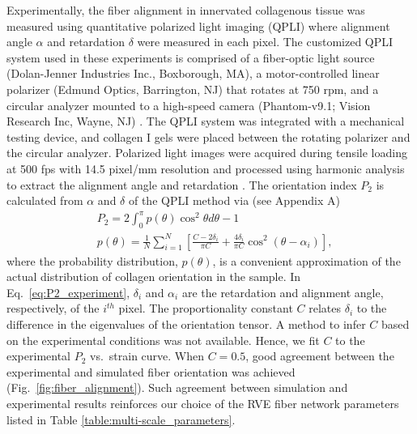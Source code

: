 \documentclass[]{interact}
\begin{document}
Experimentally, the fiber alignment in innervated collagenous tissue was measured using quantitative polarized light imaging (QPLI) \citep{Quinn:2008df,Quinn:2009bf} where alignment angle $\alpha$ and retardation $\delta$ were measured in each pixel. The customized QPLI system used in these experiments \citep{Zhang:2016ga} is comprised of a fiber-optic light source (Dolan-Jenner Industries Inc., Boxborough, MA), a motor-controlled linear polarizer (Edmund Optics, Barrington, NJ) that rotates at 750 rpm, and a circular analyzer mounted to a high-speed camera (Phantom-v9.1; Vision Research Inc, Wayne, NJ) \citep{Zhang:2016ga}. The QPLI system was integrated with a mechanical testing device, and collagen I gels were placed between the rotating polarizer and the circular analyzer. Polarized light images were acquired during tensile loading at 500 fps with 14.5 pixel/mm resolution and processed using harmonic analysis to extract the alignment angle and retardation \citep{Tower:2002hk,Quinn:2008df}. The orientation index $P_2$ is calculated from $\alpha$ and $\delta$ of the QPLI method via (see Appendix A)
%
\begin{align}
&P_2 = 2 \int_0^{\pi} p(\theta) \cos^2\theta d\theta - 1 \nonumber\\
&p(\theta) = \frac{1}{N} \sum_{i=1}^N \left[ \frac{C-2\delta_i}{\pi C} + \frac{4 \delta_i}{\pi C} \cos^2(\theta - \alpha_i)\right],
\label{eq:P2_experiment}
\end{align}
%
where the probability distribution, $p(\theta)$, is a convenient approximation of the actual distribution of collagen orientation in the sample. In Eq.\ \eqref{eq:P2_experiment}, $\delta_i$ and $\alpha_i$ are the retardation and alignment angle, respectively, of the $i^{th}$ pixel. The proportionality constant $C$ relates $\delta_i$ to the difference in the eigenvalues of the orientation tensor. A method to infer $C$ based on the experimental conditions was not available. Hence, we fit $C$ to the experimental $P_2$ vs.\ strain curve. When $C=0.5$, good agreement between the experimental and simulated fiber orientation was achieved (Fig.\ \ref{fig:fiber_alignment}). Such agreement between simulation and experimental results reinforces our choice of the RVE fiber network parameters listed in Table \ref{table:multi-scale_parameters}.
%
\end{document}
